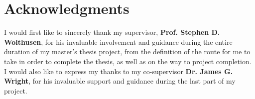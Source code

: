 


\chapter*{Acknowledgments}


I would first like to sincerely thank my supervisor, \textbf{Prof. Stephen D. Wolthusen}, for his invaluable involvement and guidance during the entire duration of my master's thesis project, from the definition of the route for me to take in order to complete the thesis, as  well as on the way to project completion.\\ 

I would also like to express my thanks to my co-supervisor \textbf{Dr. James G. Wright}, for his invaluable support and guidance during the last part of my project. 







    
